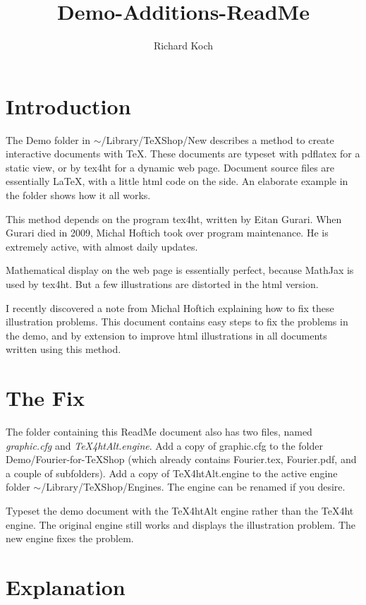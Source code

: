 \documentclass[11pt, oneside]{article}   	%
\title{Demo-Additions-ReadMe}
\author{Richard Koch}
\begin{document}
\maketitle

\section{Introduction} 
The Demo folder in $\sim$/Library/TeXShop/New describes a method to create interactive documents with TeX. These documents are
typeset with pdflatex for a static view, or by tex4ht for a dynamic web page. Document source files are essentially LaTeX,  with a little html code on the side. 
An elaborate example in the folder shows how it all works.

This method depends  on the program tex4ht, written by Eitan Gurari. When Gurari died in 2009, Michal Hoftich took over program maintenance. He is extremely active, with almost daily updates.

Mathematical display on the web page is essentially perfect, because MathJax is used by tex4ht.
But a few illustrations are distorted in the html version.

I recently discovered a note from Michal Hoftich explaining how to fix these illustration problems. This document
contains  easy steps to fix the problems in the demo, and by extension to improve html illustrations
in all documents written using this method.

 \section{The Fix} 

The folder containing this ReadMe document also has two files, named {\em graphic.cfg} and {\em TeX4htAlt.engine}.
Add a copy of graphic.cfg to the folder Demo/Fourier-for-TeXShop (which already contains Fourier.tex, Fourier.pdf,
and a couple of subfolders). Add a copy of TeX4htAlt.engine to the active engine folder 
$\sim$/Library/TeXShop/Engines. The engine can be renamed if you desire. 

Typeset the demo document with the TeX4htAlt engine rather than the TeX4ht engine. The original engine still works and displays the illustration problem. The new engine fixes the problem.

\section{Explanation}
\end{document}
